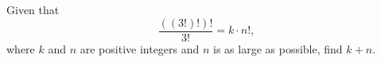 Given that
\[\dfrac{((3!)!)!}{3!}=k\cdot n!,\]
where $k$ and $n$ are positive integers and $n$ is as large as possible, find $k+n$.
